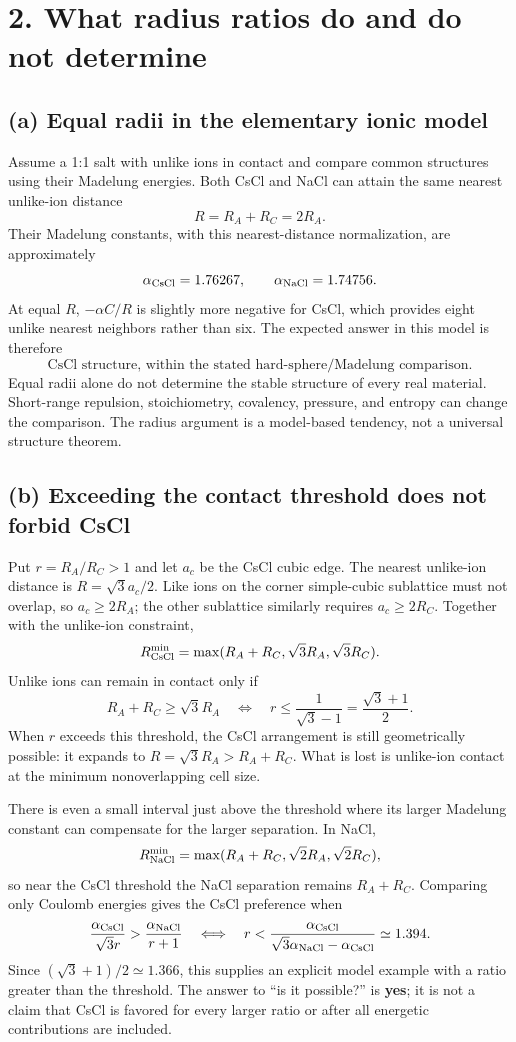 \section*{2. What radius ratios do and do not determine}
\subsection*{(a) Equal radii in the elementary ionic model}
Assume a 1:1 salt with unlike ions in contact and compare common structures using their Madelung energies. Both CsCl and NaCl can attain the same nearest unlike-ion distance
\[
R=R_A+R_C=2R_A.
\]
Their Madelung constants, with this nearest-distance normalization, are approximately
\[
\alpha_{\rm CsCl}=1.76267,\qquad \alpha_{\rm NaCl}=1.74756.
\]
At equal $R$, $-\alpha C/R$ is slightly more negative for CsCl, which provides eight unlike nearest neighbors rather than six. The expected answer in this model is therefore
\[
\boxed{\text{CsCl structure, within the stated hard-sphere/Madelung comparison}.}
\]
Equal radii alone do not determine the stable structure of every real material. Short-range repulsion, stoichiometry, covalency, pressure, and entropy can change the comparison. The radius argument is a model-based tendency, not a universal structure theorem.

\subsection*{(b) Exceeding the contact threshold does not forbid CsCl}
Put $r=R_A/R_C>1$ and let $a_c$ be the CsCl cubic edge. The nearest unlike-ion distance is $R=\sqrt3a_c/2$. Like ions on the corner simple-cubic sublattice must not overlap, so $a_c\ge2R_A$; the other sublattice similarly requires $a_c\ge2R_C$. Together with the unlike-ion constraint,
\[
R_{\rm CsCl}^{\min}=\max(R_A+R_C,\sqrt3R_A,\sqrt3R_C).
\]
Unlike ions can remain in contact only if
\[
R_A+R_C\ge\sqrt3R_A
\quad\Longleftrightarrow\quad
r\le\frac1{\sqrt3-1}=\frac{\sqrt3+1}{2}.
\]
When $r$ exceeds this threshold, the CsCl arrangement is still geometrically possible: it expands to $R=\sqrt3R_A>R_A+R_C$. What is lost is unlike-ion contact at the minimum nonoverlapping cell size.

There is even a small interval just above the threshold where its larger Madelung constant can compensate for the larger separation. In NaCl,
\[
R_{\rm NaCl}^{\min}=\max(R_A+R_C,\sqrt2R_A,\sqrt2R_C),
\]
so near the CsCl threshold the NaCl separation remains $R_A+R_C$. Comparing only Coulomb energies gives the CsCl preference when
\[
\frac{\alpha_{\rm CsCl}}{\sqrt3r}>
\frac{\alpha_{\rm NaCl}}{r+1}
\quad\Longleftrightarrow\quad
r<\frac{\alpha_{\rm CsCl}}
{\sqrt3\alpha_{\rm NaCl}-\alpha_{\rm CsCl}}\simeq1.394.
\]
Since $(\sqrt3+1)/2\simeq1.366$, this supplies an explicit model example with a ratio greater than the threshold. The answer to ``is it possible?'' is \textbf{yes}; it is not a claim that CsCl is favored for every larger ratio or after all energetic contributions are included.

